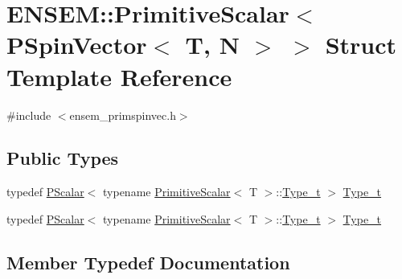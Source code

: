 \hypertarget{structENSEM_1_1PrimitiveScalar_3_01PSpinVector_3_01T_00_01N_01_4_01_4}{}\section{E\+N\+S\+EM\+:\+:Primitive\+Scalar$<$ P\+Spin\+Vector$<$ T, N $>$ $>$ Struct Template Reference}
\label{structENSEM_1_1PrimitiveScalar_3_01PSpinVector_3_01T_00_01N_01_4_01_4}


{\ttfamily \#include $<$ensem\+\_\+primspinvec.\+h$>$}

\subsection*{Public Types}
\begin{DoxyCompactItemize}
\item 
typedef \mbox{\hyperlink{classENSEM_1_1PScalar}{P\+Scalar}}$<$ typename \mbox{\hyperlink{structENSEM_1_1PrimitiveScalar}{Primitive\+Scalar}}$<$ T $>$\+::\mbox{\hyperlink{structENSEM_1_1PrimitiveScalar_3_01PSpinVector_3_01T_00_01N_01_4_01_4_ae74b3341c6408b55d594cc603d4ee470}{Type\+\_\+t}} $>$ \mbox{\hyperlink{structENSEM_1_1PrimitiveScalar_3_01PSpinVector_3_01T_00_01N_01_4_01_4_ae74b3341c6408b55d594cc603d4ee470}{Type\+\_\+t}}
\item 
typedef \mbox{\hyperlink{classENSEM_1_1PScalar}{P\+Scalar}}$<$ typename \mbox{\hyperlink{structENSEM_1_1PrimitiveScalar}{Primitive\+Scalar}}$<$ T $>$\+::\mbox{\hyperlink{structENSEM_1_1PrimitiveScalar_3_01PSpinVector_3_01T_00_01N_01_4_01_4_ae74b3341c6408b55d594cc603d4ee470}{Type\+\_\+t}} $>$ \mbox{\hyperlink{structENSEM_1_1PrimitiveScalar_3_01PSpinVector_3_01T_00_01N_01_4_01_4_ae74b3341c6408b55d594cc603d4ee470}{Type\+\_\+t}}
\end{DoxyCompactItemize}


\subsection{Member Typedef Documentation}
\mbox{\label{structENSEM_1_1PrimitiveScalar_3_01PSpinVector_3_01T_00_01N_01_4_01_4_ae74b3341c6408b55d594cc603d4ee470}} 
